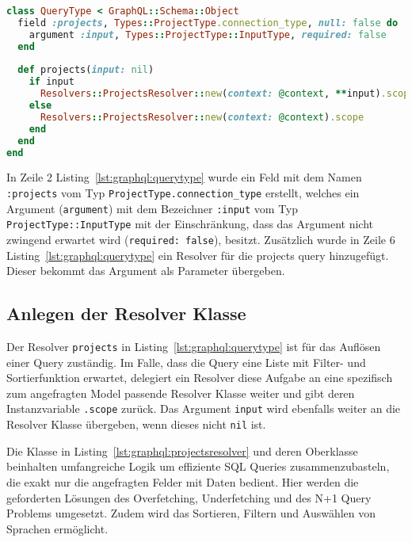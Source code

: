 \begin{lstlisting}[language=Ruby,float=h!,caption={Definition des QueryType als Einstiegspunkt in alle Queries. \lstinline|/graphql/types/query_type.rb|}, label={lst:graphql:querytype}]
class QueryType < GraphQL::Schema::Object
  field :projects, Types::ProjectType.connection_type, null: false do
    argument :input, Types::ProjectType::InputType, required: false
  end
  
  def projects(input: nil)
    if input
      Resolvers::ProjectsResolver::new(context: @context, **input).scope
    else
      Resolvers::ProjectsResolver::new(context: @context).scope
    end
  end
end
\end{lstlisting}

In Zeile 2 Listing~\ref{lst:graphql:querytype} wurde ein Feld mit dem Namen \texttt{:projects} vom Typ \texttt{ProjectType\-.connection\_type} erstellt, welches ein Argument (\texttt{argument}) mit dem Bezeichner \texttt{:input} vom Typ \texttt{ProjectType::InputType} mit der Einschränkung, dass das Argument nicht zwingend erwartet wird (\texttt{required: false}), besitzt.
Zusätzlich wurde in Zeile 6 Listing~\ref{lst:graphql:querytype} ein Resolver für die projects query hinzugefügt. Dieser bekommt das Argument als Parameter übergeben.

\subsection{Anlegen der Resolver Klasse}
\label{impl:graphql:resolver}
Der Resolver \texttt{projects} in Listing~\ref{lst:graphql:querytype} ist für das Auflösen einer Query zuständig. Im Falle, dass die Query eine Liste mit Filter- und Sortierfunktion erwartet,
delegiert ein Resolver diese Aufgabe an eine spezifisch zum angefragten Model passende Resolver Klasse weiter und gibt deren Instanzvariable \texttt{.scope} zurück. Das Argument \texttt{input} wird ebenfalls weiter an die Resolver Klasse übergeben, wenn dieses nicht \texttt{nil} ist. 

Die Klasse in Listing~\ref{lst:graphql:projectsresolver} und deren Oberklasse beinhalten umfangreiche Logik um effiziente SQL Queries zusammenzubasteln, die exakt nur die angefragten Felder mit Daten bedient. Hier werden die geforderten Lösungen des Overfetching, Underfetching und des N+1 Query Problems umgesetzt. Zudem wird das Sortieren, Filtern und Auswählen von Sprachen ermöglicht.

